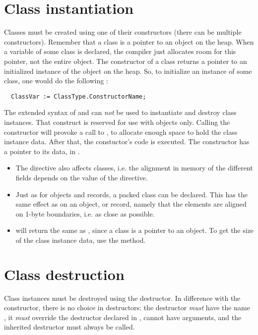\section{Class instantiation}
\label{se:classinstantiation}
Classes must be created using one of their constructors (there can be
multiple constructors). Remember that a class is a pointer to an object on
the heap. When a variable of some class is declared, the compiler just 
allocates room for this pointer, not the entire object. The constructor of
a class returns a pointer to an initialized instance of the object on the
heap. So, to initialize an instance of some class, one would do the following :
\begin{verbatim}
  ClassVar := ClassType.ConstructorName;
\end{verbatim}
The extended syntax of  and  can {\em not} be used to
instantiate and destroy class instances.
That construct is reserved for use with objects only.
Calling the constructor will provoke a call to , to allocate
enough space to hold the class instance data.
After that, the constuctor's code is executed.
The constructor has a pointer to its data, in .

\begin{remark}
\begin{itemize}
\item The  directive also affects classes,
i.e. the alignment in memory of the different fields depends on the
value of  the  directive.
\item Just as for objects and records, a packed class can be declared.
This has the same effect as on an object, or record, namely that the
elements are aligned on 1-byte boundaries, i.e. as close as possible.
\item {} will return the same as , 
since a class is a pointer to an object. To get the size of the class 
instance data, use the  method.
\end{itemize}
\end{remark}

\section{Class destruction}
Class instances must be destroyed using the destructor. In difference with
the constructor, there is no choice in destructors: the destructor {\em must} 
have the name , it {\em must}  override the  destructor 
declared in , cannot have arguments, and the inherited destructor 
must always be called.

